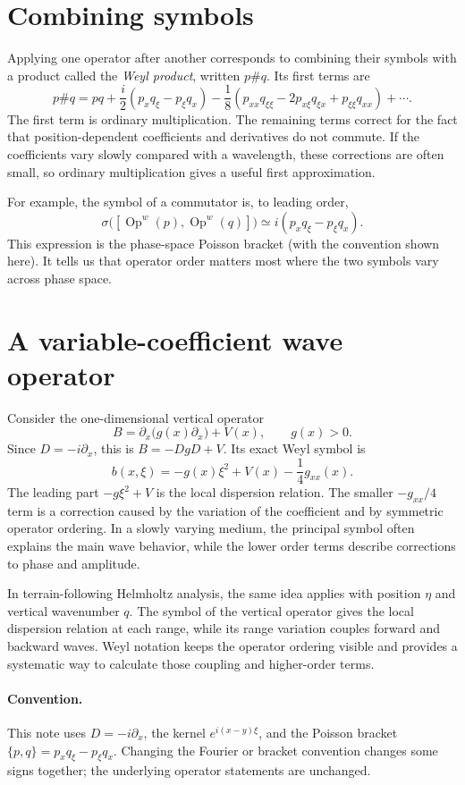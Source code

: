 \documentclass[11pt]{article}
\newcommand{\Op}{\operatorname{Op}^{w}}
\newcommand{\pd}{\partial}
\begin{document}
\section{Combining symbols}

Applying one operator after another corresponds to combining their symbols
with a product called the \emph{Weyl product}, written $p\#q$. Its first terms
are
\begin{equation}\label{eq:moyal}
  p\#q=pq+\frac{i}{2}
  \left(p_xq_\xi-p_\xi q_x\right)
  -\frac18\left(p_{xx}q_{\xi\xi}-2p_{x\xi}q_{\xi x}
  +p_{\xi\xi}q_{xx}\right)+\cdots.
\end{equation}
The first term is ordinary multiplication. The remaining terms correct for
the fact that position-dependent coefficients and derivatives do not
commute. If the coefficients vary slowly compared with a wavelength, these
corrections are often small, so ordinary multiplication gives a useful first
approximation.

For example, the symbol of a commutator is, to leading order,
\begin{equation}
  \sigma\bigl([\Op(p),\Op(q)]\bigr)
  \simeq i\left(p_xq_\xi-p_\xi q_x\right).
\end{equation}
This expression is the phase-space Poisson bracket (with the convention
shown here). It tells us that operator order matters most where the two
symbols vary across phase space.

\section{A variable-coefficient wave operator}

Consider the one-dimensional vertical operator
\begin{equation}
  B=\pd_x\bigl(g(x)\pd_x\bigr)+V(x),\qquad g(x)>0.
\end{equation}
Since $D=-i\pd_x$, this is $B=-DgD+V$. Its exact Weyl symbol is
\begin{equation}\label{eq:variable}
  b(x,\xi)=-g(x)\xi^2+V(x)-\frac14g_{xx}(x).
\end{equation}
The leading part $-g\xi^2+V$ is the local dispersion relation. The smaller
$-g_{xx}/4$ term is a correction caused by the variation of the coefficient
and by symmetric operator ordering. In a slowly varying medium, the
principal symbol often explains the main wave behavior, while the lower
order terms describe corrections to phase and amplitude.

In terrain-following Helmholtz analysis, the same idea applies with position
$\eta$ and vertical wavenumber $q$. The symbol of the vertical operator gives
the local dispersion relation at each range, while its range variation
couples forward and backward waves. Weyl notation keeps the operator ordering
visible and provides a systematic way to calculate those coupling and
higher-order terms.

\paragraph{Convention.} This note uses $D=-i\pd_x$, the kernel
$e^{i(x-y)\xi}$, and the Poisson bracket
$\{p,q\}=p_xq_\xi-p_\xi q_x$. Changing the Fourier or bracket convention
changes some signs together; the underlying operator statements are
unchanged.
\end{document}
